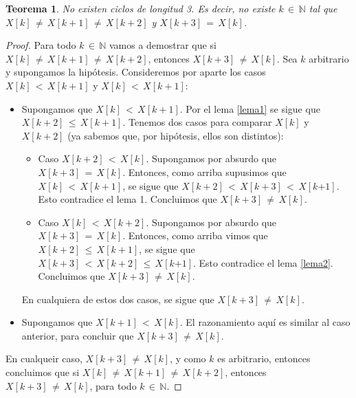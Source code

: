 \documentclass{article}
\newtheorem{teor}{Teorema}
\begin{document}
\begin{teor}
No existen ciclos de longitud 3. Es decir, no existe $k\,{\in}\,\mathbb{N}$ tal que $X[k]\,{\neq}\, X[k{+}1]\,{\neq}\, X[k{+}2]$ y $X[k{+}3]\,{=}\,X[k]$. 
\end{teor}
\begin{proof}
Para todo $k\,{\in}\,\mathbb{N}$ vamos a demostrar que si $X[k]\,{\neq}\, X[k{+}1]\,{\neq}\, X[k{+}2]$, entonces $X[k{+}3]\,{\neq}\,X[k]$. Sea $k$ arbitrario y supongamos la hipótesis. Consideremos por aparte los casos $X[k]\,{<}\, X[k{+}1]$ y $X[k]\,{<}\, X[k{+}1]$:
%
\begin{itemize}
\item Supongamos que $X[k]\,{<}\, X[k{+}1]$. Por el lema \ref{lema1} se sigue que $X[k{+}2]\,{\leq}\, X[k{+}1]$. Tenemos dos casos para comparar $X[k]$ y $X[k{+}2]$ (ya sabemos que, por hipótesis, ellos son distintos):
	\begin{itemize}
	\item Caso $X[k{+}2]\,{<}\,X[k]$. Supongamos por absurdo que $X[k{+}3]\,{=}\,X[k]$. Entonces, como arriba supusimos que $X[k]\,{<}\, X[k{+}1]$, se sigue que $X[k{+}2]\,{<}\,X[k{+}3]\,{<}\,X[k{+1}]$. Esto contradice el lema 1. Concluimos que $X[k{+}3]\,{\neq}\,X[k]$.
	\item Caso $X[k]\,{<}\,X[k{+}2]$. Supongamos por absurdo que $X[k{+}3]\,{=}\,X[k]$. Entonces, como arriba vimos que $X[k{+}2]\,{\leq}\, X[k{+}1]$, se sigue que $X[k{+}3]\,{<}\,X[k{+}2]\,{\leq}\,X[k{+1}]$. Esto contradice el lema \ref{lema2}. Concluimos que $X[k{+}3]\,{\neq}\,X[k]$.
	\end{itemize}
	En cualquiera de estos dos casos, se sigue que $X[k{+}3]\,{\neq}\,X[k]$.

\item Supongamos que $X[k{+}1]\,{<}\, X[k]$. El razonamiento aquí es similar al caso anterior, para concluir que $X[k{+}3]\,{\neq}\,X[k]$.
\end{itemize}
En cualqueir caso, $X[k{+}3]\,{\neq}\,X[k]$, y como $k$ es arbitrario, entonces concluimos que si $X[k]\,{\neq}\, X[k{+}1]\,{\neq}\, X[k{+}2]$, entonces $X[k{+}3]\,{\neq}\,X[k]$, para todo $k\,{\in}\,\mathbb{N}$.
\end{proof}
\end{document}
